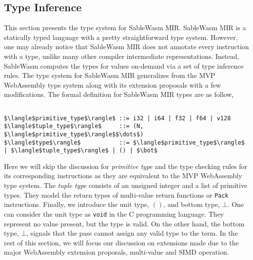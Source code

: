 \subsection{Type Inference}

This section presents the type system for SableWasm MIR. SableWasm MIR is a
statically typed language with a pretty straightforward type system. However,
one may already notice that SableWasm MIR does not annotate every instruction
with a type, unlike many other compiler intermediate representations. Instead,
SableWasm computes the types for values on-demand via a set of type inference
rules. The type system for SableWasm MIR generalizes from the MVP WebAssembly
type system along with its extension proposals with a few modifications. The
formal definition for SableWasm MIR types are as follow,

\begin{lstlisting}[basicstyle=\linespread{1}\ttfamily, mathescape=true]

$\langle$primitive_type$\rangle$ ::= i32 | i64 | f32 | f64 | v128
$\langle$tuple_type$\rangle$     ::= (N, $\langle$primitive_type$\rangle$$\dots$)
$\langle$type$\rangle$           ::= $\langle$primitive_type$\rangle$ | $\langle$tuple_type$\rangle$ | () | $\bot$

\end{lstlisting}

Here we will skip the discussion for \emph{primitive type} and the type checking
rules for its corresponding instructions as they are equivalent to the MVP
WebAssembly type system. The \emph{tuple type} consists of an unsigned integer
and a list of primitive types. They model the return types of multi-value return
functions or \texttt{Pack} instructions. Finally, we introduce the unit type,
$()$, and bottom type, $\bot$. One can consider the unit type as \texttt{void}
in the C programming language. They represent no value present, but the type is
valid. On the other hand, the bottom type, $\bot$, signals that the pass cannot
assign any valid type to the term. In the rest of this section, we will focus
our discussion on extensions made due to the major WebAssembly extension
proposals, multi-value and SIMD operation.

